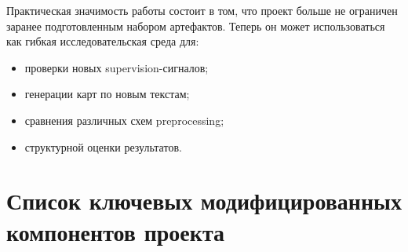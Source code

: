 \documentclass[12pt,a4paper]{article}
\begin{document}
Практическая значимость работы состоит в том, что проект больше не ограничен заранее
подготовленным набором артефактов. Теперь он может использоваться как гибкая
исследовательская среда для:

\begin{itemize}
    \item проверки новых supervision-сигналов;
    \item генерации карт по новым текстам;
    \item сравнения различных схем preprocessing;
    \item структурной оценки результатов.
\end{itemize}

\section{Список ключевых модифицированных компонентов проекта}
\end{document}
